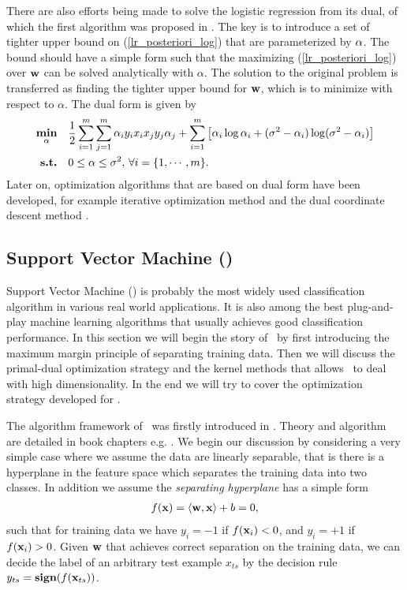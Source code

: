 There are also efforts being made to solve the logistic regression from its dual, of which the first algorithm was proposed in \citep{Jaakkola99probabilistic}.
The key is to introduce a set of tighter upper bound on (\ref{lr_posteriori_log}) that are parameterized by $\mathbf {\alpha}$.
The bound should have a simple form such that the maximizing (\ref{lr_posteriori_log}) over $\mathbf {w}$ can be solved analytically with $\alpha$.
The solution to the original problem is transferred as finding the tighter upper bound for  $\mathbf {w}$, which is to minimize with respect to $\alpha$.
The dual form is given by 
\begin{align*}
	\underset{\mathbf {\alpha}}{\textbf{min}} & \quad\frac{1}{2}\sum_{i=1}^{m}\sum_{j=1}^{m}\mathbf {\alpha}_iy_ix_ix_jy_j\mathbf {\alpha}_j + \sum_{i=1}^{m}\left[\mathbf {\alpha}_i\log\alpha_i+(\sigma^2-\mathbf {\alpha}_i)\log(\sigma^2-\mathbf {\alpha}_i)\right] \\
	\textbf{s.t.} &\quad 0\le\alpha\le\sigma^2, \, \forall i=\{1,\cdots,m\}.
\end{align*}
Later on, optimization algorithms that are based on dual form have been developed, for example iterative optimization method \citep{Keerthi05a} and the dual coordinate descent method \citep{Yu11dual}.



%
\subsection{Support Vector Machine (\svm)}
\label{sc_svm}

Support Vector Machine (\svm) is probably the most widely used classification algorithm in various real world applications.
It is also among the best plug-and-play machine learning algorithms that usually achieves good classification performance.
In this section we will begin the story of \svm\ by first introducing the maximum margin principle of separating training data.
Then we will discuss the primal-dual optimization strategy and the kernel methods that allows \svm\ to deal with high dimensionality.
In the end we will try to cover the optimization strategy developed for \svm.

The algorithm framework of \svm\ was firstly introduced in \citep{Boser92,Cortes95support}.
Theory and algorithm are detailed in book chapters e.g. \citep{Scholkopf02learning,taylor04,Bishop07}.
We begin our discussion by considering a very simple case where we assume the data are linearly separable, that is there is a hyperplane in the feature space which separates the training data into two classes.
In addition we assume the \textit{separating hyperplane} has a simple form
\begin{align*}
	f(\mathbf {x})=\langle \mathbf {w}, \mathbf {x} \rangle + b = 0,
\end{align*}
such that for training data we have $y_i=-1$ if $f(\mathbf {x}_i)<0$, and $y_i=+1$ if $f(\mathbf {x}_i)>0$.
Given $\mathbf {w}$ that achieves correct separation on the training data, we can decide the label of an arbitrary test example $x_{ts}$ by the decision rule $y_{ts}=\textbf{sign}(f(\mathbf {x}_{ts}))$.

